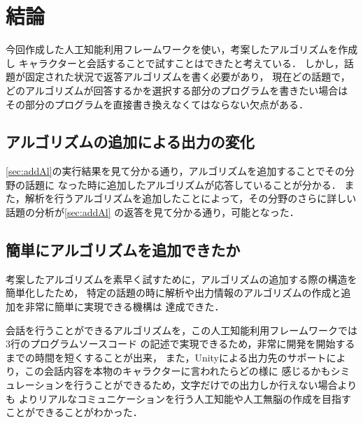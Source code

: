 
\section{結論}
今回作成した人工知能利用フレームワークを使い，考案したアルゴリズムを作成し
キャラクターと会話することで試すことはできたと考えている．
しかし，話題が固定された状況で返答アルゴリズムを書く必要があり，
現在どの話題で，どのアルゴリズムが回答するかを選択する部分のプログラムを書きたい場合は
その部分のプログラムを直接書き換えなくてはならない欠点がある．

\subsection{アルゴリズムの追加による出力の変化}
\ref{sec:addAl}の実行結果を見て分かる通り，アルゴリズムを追加することでその分野の話題に
なった時に追加したアルゴリズムが応答していることが分かる．
また，解析を行うアルゴリズムを追加したことによって，その分野のさらに詳しい話題の分析が\ref{sec:addAl}
の返答を見て分かる通り，可能となった．

\subsection{簡単にアルゴリズムを追加できたか}
考案したアルゴリズムを素早く試すために，アルゴリズムの追加する際の構造を簡単化したため，
特定の話題の時に解析や出力情報のアルゴリズムの作成と追加を非常に簡単に実現できる機構は
達成できた．

会話を行うことができるアルゴリズムを，この人工知能利用フレームワークでは3行のプログラムソースコード
の記述で実現できるため，非常に開発を開始するまでの時間を短くすることが出来，
また，Unityによる出力先のサポートにより，この会話内容を本物のキャラクターに言われたらどの様に
感じるかもシミュレーションを行うことができるため，文字だけでの出力しか行えない場合よりも
よりリアルなコミュニケーションを行う人工知能や人工無脳の作成を目指すことができることがわかった．


